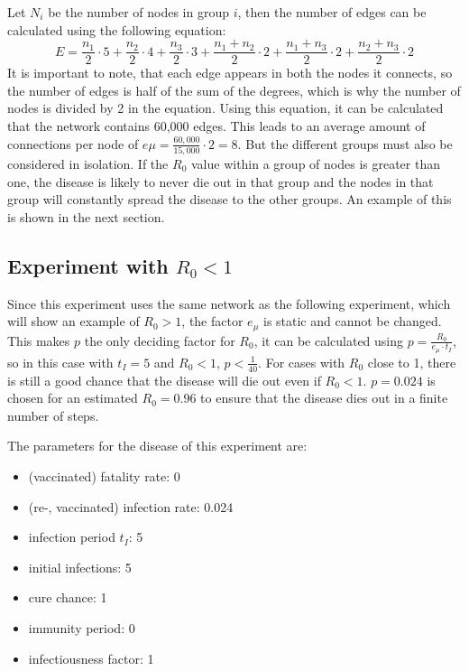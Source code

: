 Let $N_i$ be the number of nodes in group $i$, then the number of edges can be calculated using the following equation:
\begin{equation}
    E = \frac{n_1}{2} \cdot 5 + \frac{n_2}{2} \cdot 4 + \frac{n_3}{2} \cdot 3 + \frac{n_1+n_2}{2} \cdot 2 + \frac{n_1+n_3}{2} \cdot 2 + \frac{n_2+n_3}{2} \cdot 2
\end{equation}
It is important to note, that each edge appears in both the nodes it connects, so the number of edges is half of the sum of the degrees, which is why the number of nodes is divided by 2 in the equation. Using this equation, it can be calculated that the network contains 60,000 edges. This leads to an average amount of connections per node of $e\mu=\frac{60,000}{15,000} \cdot 2 = 8$. But the different groups must also be considered in isolation. If the $R_0$ value within a group of nodes is greater than one, the disease is likely to never die out in that group and the nodes in that group will constantly spread the disease to the other groups. An example of this is shown in the next section.

\subsection{Experiment with $R_0 < 1$}
Since this experiment uses the same network as the following experiment, which will show an example of $R_0 > 1$, the factor $e_\mu$ is static and cannot be changed. This makes $p$ the only deciding factor for $R_0$, it can be calculated using $p = \frac{R_0}{e_\mu \cdot t_I}$, so in this case with $t_I=5$ and $R_0 < 1$, $p < \frac{1}{40}$. For cases with $R_0$ close to 1, there is still a good chance that the disease will die out even if $R_0 < 1$. $p=0.024$ is chosen for an estimated $R_0=0.96$ to ensure that the disease dies out in a finite number of steps.

The parameters for the disease of this experiment are:
\begin{itemize}
    \item (vaccinated) fatality rate: 0
    \item (re-, vaccinated) infection rate: 0.024
    \item infection period $t_I$: 5
    \item initial infections: 5
    \item cure chance: 1
    \item immunity period: 0
    \item infectiousness factor: 1
\end{itemize}

